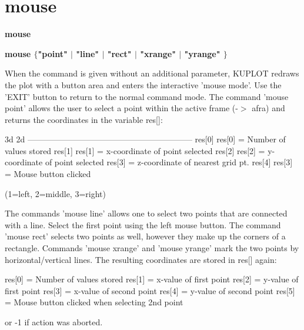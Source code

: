 \section{mouse}
{\bf mouse \par }
{\bf mouse $ \{$"point" $| $ "line" $| $ "rect" $| $ "xrange" $| $ "yrange" $\} $ \par }
\par
\vspace{3pt}
When the command is given without an additional parameter, KUPLOT 
redraws the plot with a button area and enters the interactive 
'mouse mode'. Use the 'EXIT' button to return to the normal command 
mode. The command 'mouse point' allows the user to select a point 
within the active frame (-$> $ afra) and returns the coordinates 
in the variable res[]: 
\par
\begin{MacVerbatim}
   3d        2d
  ------------------------------------------------------------
  res[0]     res[0]       = Number of values stored
  res[1]     res[1]       = x-coordinate of point selected
  res[2]     res[2]       = y-coordinate of point selected
  res[3]                  = z-coordinate of nearest grid pt.
  res[4]     res[3]       = Mouse button clicked
\end{MacVerbatim}
                            (1=left, 2=middle, 3=right) 
\par
The commands 'mouse line' allows one to select two points 
that are connected with a line. Select the first point using 
the left mouse button. The command 'mouse rect' selects 
two points as well, however they make up the corners of a 
rectangle. Commands 'mouse xrange' and 'mouse yrange' mark the 
two points by horizontal/vertical lines. The resulting coordinates 
are stored in res[] again: 
\par
\begin{MacVerbatim}
  res[0]     = Number of values stored
  res[1]     = x-value of first point
  res[2]     = y-value of first point
  res[3]     = x-value of second point
  res[4]     = y-value of second point
  res[5]     = Mouse button clicked when selecting 2nd point
\end{MacVerbatim}
               or -1 if action was aborted. 
